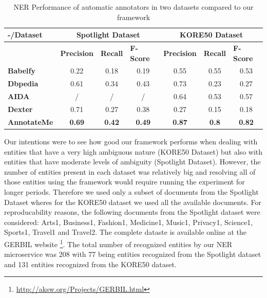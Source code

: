 \begin{table}[htbp]
  \centering
  \caption{NER Performance of automatic annotators in two datasets compared to our framework}
    \begin{tabular}{|l|ccc|ccc|}
    \toprule
    \textbf{-/Dataset} & \multicolumn{3}{c|}{\textbf{Spotlight Dataset}} & \multicolumn{3}{c|}{\textbf{KORE50 Dataset}} \\
    \midrule
          & \multicolumn{1}{l|}{\textbf{Precision}} & \multicolumn{1}{l|}{\textbf{Recall}} & \multicolumn{1}{l|}{\textbf{F-Score}} & \multicolumn{1}{l|}{\textbf{Precision}} & \multicolumn{1}{l|}{\textbf{Recall}} & \multicolumn{1}{l|}{\textbf{F-Score}} \\
    \midrule
    \textbf{Babelfy} & 0.22  & 0.18  & 0.19  & 0.55  & 0.55  & 0.53 \\
    \textbf{Dbpedia} & 0.61  & 0.34  & 0.43  & 0.73  & 0.23  & 0.27 \\
    \textbf{AIDA} & /     & /     & /     & 0.64  & 0.53  & 0.57 \\
    \textbf{Dexter} & 0.71  & 0.27  & 0.38  & 0.27  & 0.15  & 0.18 \\
    \textbf{AnnotateMe } & \textcolor[rgb]{ 1,  0,  0}{\textbf{0.69}} & \textcolor[rgb]{ 1,  0,  0}{\textbf{0.42}} & \textcolor[rgb]{ 1,  0,  0}{\textbf{0.49}} & \textcolor[rgb]{ 1,  0,  0}{\textbf{0.87}} & \textcolor[rgb]{ 1,  0,  0}{\textbf{0.8}} & \textcolor[rgb]{ 1,  0,  0}{\textbf{0.82}} \\
    \bottomrule
    \end{tabular}%
  \label{tab:ex1-nerperformance}%
\end{table}%

Our intentions were to see how good our framework performs when dealing with entities that have a very high ambiguous nature (KORE50 Dataset) but also with entities that have moderate levels of ambiguity (Spotlight Dataset). However, the number of entities present in each dataset was relatively big and resolving all of those entities using the framework would require running the experiment for longer periods. Therefore we used only a subset of documents from the Spotlight Dataset wheres for the KORE50 dataset we used all the available documents. For reproducability reasons, the following documents from the Spotlight dataset were considered: Arts1, Business1, Fashion1, Medicine1, Music1, Privacy1, Science1, Sports1, Travel1 and Travel2. The complete dataste is available online at the GERBIL website \footnote{\url{http://aksw.org/Projects/GERBIL.html}}. The total number of recognized entities by our NER microservice was 208 with 77 being entities recognized from the Spotlight dataset and 131 entities recognized from the KORE50 dataset.


